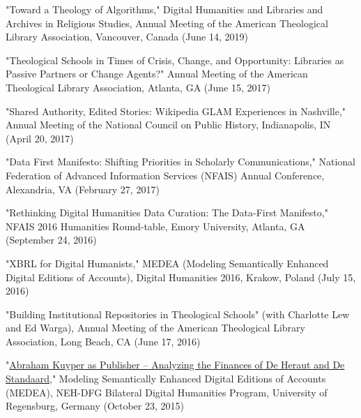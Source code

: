 \documentclass[10pt]{res} %
\begin{document}
\begin{resume}
\begin{hangparas}{.25in}{1}"Toward a Theology of Algorithms," Digital Humanities and Libraries and Archives in Religious Studies, Annual Meeting of the American Theological Library Association, Vancouver, Canada (June 14, 2019)\end{hangparas}

\begin{hangparas}{.25in}{1}"Theological Schools in Times of Crisis, Change, and Opportunity: Libraries as Passive Partners or Change Agents?" Annual Meeting of the American Theological Library Association, Atlanta, GA (June 15, 2017)\end{hangparas}

\begin{hangparas}{.25in}{1}"Shared Authority, Edited Stories: Wikipedia GLAM Experiences in Nashville," Annual Meeting of the National Council on Public History, Indianapolis, IN (April 20, 2017)\end{hangparas}

\begin{hangparas}{.25in}{1}"Data First Manifesto: Shifting Priorities in Scholarly Communications," National Federation of Advanced Information Services (NFAIS) Annual Conference, Alexandria, VA (February 27, 2017)\end{hangparas}

\begin{hangparas}{.25in}{1}"Rethinking Digital Humanities Data Curation: The Data-First Manifesto," NFAIS 2016 Humanities Round-table, Emory University, Atlanta, GA (September 24, 2016)\end{hangparas}

\begin{hangparas}{.25in}{1}"XBRL for Digital Humanists," MEDEA (Modeling Semantically Enhanced Digital Editions of Accounts), Digital Humanities 2016, Krakow, Poland (July 15, 2016)\end{hangparas}

\begin{hangparas}{.25in}{1}"Building Institutional Repositories in Theological Schools" (with Charlotte Lew and Ed Warga), Annual Meeting of the American Theological Library Association, Long Beach, CA (June 17, 2016)\end{hangparas}

\begin{hangparas}{.25in}{1}"\href{http://medea.hypotheses.org/200}{Abraham Kuyper as Publisher – Analyzing the Finances of De Heraut and De Standaard}," Modeling Semantically Enhanced Digital Editions of Accounts (MEDEA), NEH-DFG Bilateral Digital Humanities Program, University of Regensburg, Germany (October 23, 2015)\end{hangparas}


\end{resume}
\end{document}
